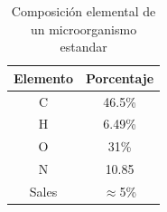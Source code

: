 \begin{table}[H]
\centering
\caption{Composición elemental de un microorganismo estandar}
\label{tab:comp_est_micro}
\begin{threeparttable}
{
\begin{tabular}{cc}\hline
    
    \bfseries{Elemento} & \bfseries{Porcentaje} \\ \hline
    
    C & 46.5\% \\
    H & 6.49\% \\
    O & 31\% \\
    N & 10.85 \\
    Sales & $\approx$5\% \\
    
    \hline
\end{tabular}
}
\begin{tablenotes}
    \item[] 
\end{tablenotes}
\end{threeparttable}
\end{table}